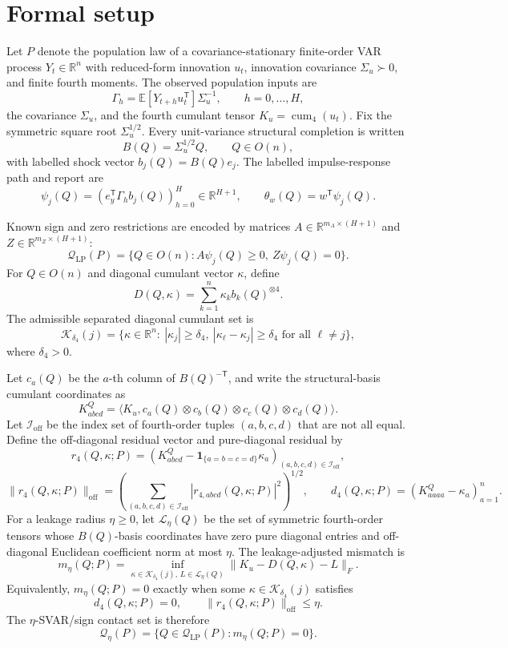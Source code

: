\documentclass[11pt]{article}
\newcommand{\E}{\mathbb{E}}
\newcommand{\one}{\mathbf{1}}
\newcommand{\transpose}{\mathsf{T}}
\newcommand{\R}{\mathbb{R}}
\theoremstyle{definition}
\theoremstyle{plain}
\theoremstyle{remark}
\begin{document}
\section{Formal setup}
Let \(P\) denote the population law of a covariance-stationary finite-order VAR process \(Y_t\in\R^n\) with reduced-form innovation \(u_t\), innovation covariance \(\Sigma_u\succ0\), and finite fourth moments.  The observed population inputs are
\[
\Gamma_h=\E[Y_{t+h}u_t^\transpose]\Sigma_u^{-1},\qquad h=0,\ldots,H,
\]
the covariance \(\Sigma_u\), and the fourth cumulant tensor \(K_u=\operatorname{cum}_4(u_t)\).  Fix the symmetric square root \(\Sigma_u^{1/2}\).  Every unit-variance structural completion is written
\[
B(Q)=\Sigma_u^{1/2}Q,\qquad Q\in O(n),
\]
with labelled shock vector \(b_j(Q)=B(Q)e_j\).  The labelled impulse-response path and report are
\[
\psi_j(Q)=\left(e_y^\transpose\Gamma_h b_j(Q)\right)_{h=0}^H\in\R^{H+1},
\qquad
\theta_w(Q)=w^\transpose\psi_j(Q).
\]

Known sign and zero restrictions are encoded by matrices \(A\in\R^{m_A\times(H+1)}\) and \(Z\in\R^{m_Z\times(H+1)}\):
\[
\mathcal Q_{\mathrm{LP}}(P)=
\{Q\in O(n):A\psi_j(Q)\ge0,\ Z\psi_j(Q)=0\}.
\]
For \(Q\in O(n)\) and diagonal cumulant vector \(\kappa\), define
\[
D(Q,\kappa)=\sum_{k=1}^n\kappa_k b_k(Q)^{\otimes4}.
\]
The admissible separated diagonal cumulant set is
\[
\mathcal K_{\delta_4}(j)=
\{\kappa\in\R^n:\ |\kappa_j|\ge\delta_4,\ 
|\kappa_\ell-\kappa_j|\ge\delta_4\text{ for all }\ell\ne j\},
\]
where \(\delta_4>0\).

Let \(c_a(Q)\) be the \(a\)-th column of \(B(Q)^{-\transpose}\), and write the structural-basis cumulant coordinates as
\[
K^Q_{abcd}=
\langle K_u,c_a(Q)\otimes c_b(Q)\otimes c_c(Q)\otimes c_d(Q)\rangle .
\]
Let \(\mathcal I_{\mathrm{off}}\) be the index set of fourth-order tuples \((a,b,c,d)\) that are not all equal.  Define the off-diagonal residual vector and pure-diagonal residual by
\[
r_4(Q,\kappa;P)=
\left(K^Q_{abcd}-\one_{\{a=b=c=d\}}\kappa_a\right)_{(a,b,c,d)\in\mathcal I_{\mathrm{off}}},
\]
\[
\|r_4(Q,\kappa;P)\|_{\mathrm{off}}=
\left(\sum_{(a,b,c,d)\in\mathcal I_{\mathrm{off}}}
|r_{4,abcd}(Q,\kappa;P)|^2\right)^{1/2},
\qquad
d_4(Q,\kappa;P)=\left(K^Q_{aaaa}-\kappa_a\right)_{a=1}^n.
\]
For a leakage radius \(\eta\ge0\), let \(\mathcal L_\eta(Q)\) be the set of symmetric fourth-order tensors whose \(B(Q)\)-basis coordinates have zero pure diagonal entries and off-diagonal Euclidean coefficient norm at most \(\eta\).  The leakage-adjusted mismatch is
\[
m_\eta(Q;P)=
\inf_{\kappa\in\mathcal K_{\delta_4}(j),\,L\in\mathcal L_\eta(Q)}
\|K_u-D(Q,\kappa)-L\|_F.
\]
Equivalently, \(m_\eta(Q;P)=0\) exactly when some \(\kappa\in\mathcal K_{\delta_4}(j)\) satisfies
\[
d_4(Q,\kappa;P)=0,\qquad
\|r_4(Q,\kappa;P)\|_{\mathrm{off}}\le\eta .
\]
The \(\eta\)-SVAR/sign contact set is therefore
\[
\mathcal Q_\eta(P)=
\{Q\in\mathcal Q_{\mathrm{LP}}(P):m_\eta(Q;P)=0\}.
\]
\end{document}
